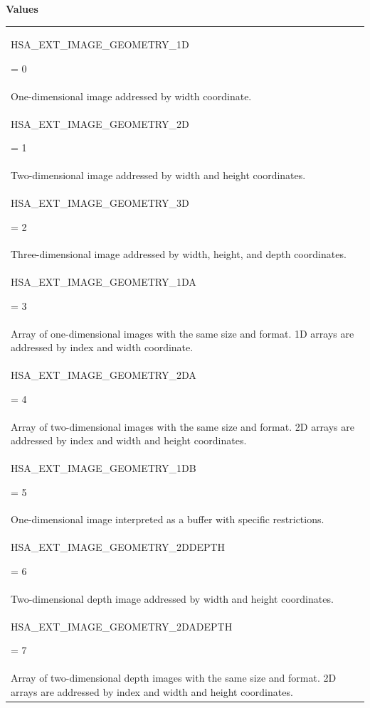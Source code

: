 \documentclass[final]{book}
\newcommand{\reftyp}[1]{#1}
\newcommand{\refenu}[1]{\reftyp{#1}}
\begin{document}
\noindent\textbf{Values}\\[-5mm]
\begin{longtable}{@{\hspace{2em}}p{\linewidth-2em}}
\hspace{-2em}\hypertarget{group__images_1ggac61587d98a80d1660378e3904a66fc9caa025ea993dbfe3101d3ff0caea2ea0cf}{\refenu{HSA_\-EXT_\-IMAGE_\-GEOMETRY_\-1D}} = 0\\One-dimensional image addressed by width coordinate.\\[2mm]
\hspace{-2em}\hypertarget{group__images_1ggac61587d98a80d1660378e3904a66fc9ca4bcc28ccad5a32bd9c9dbf203da4464e}{\refenu{HSA_\-EXT_\-IMAGE_\-GEOMETRY_\-2D}} = 1\\Two-dimensional image addressed by width and height coordinates.\\[2mm]
\hspace{-2em}\hypertarget{group__images_1ggac61587d98a80d1660378e3904a66fc9ca2e749b6b96377b9a744fc837296e318c}{\refenu{HSA_\-EXT_\-IMAGE_\-GEOMETRY_\-3D}} = 2\\Three-dimensional image addressed by width, height, and depth coordinates.\\[2mm]
\hspace{-2em}\hypertarget{group__images_1ggac61587d98a80d1660378e3904a66fc9cad989c8e619b376dc98ac3950be9afa33}{\refenu{HSA_\-EXT_\-IMAGE_\-GEOMETRY_\-1DA}} = 3\\Array of one-dimensional images with the same size and format. 1D arrays are addressed by index and width coordinate.\\[2mm]
\hspace{-2em}\hypertarget{group__images_1ggac61587d98a80d1660378e3904a66fc9ca90929e69cbf0b447060e1aeb23fd6dd4}{\refenu{HSA_\-EXT_\-IMAGE_\-GEOMETRY_\-2DA}} = 4\\Array of two-dimensional images with the same size and format. 2D arrays are addressed by index and width and height coordinates.\\[2mm]
\hspace{-2em}\hypertarget{group__images_1ggac61587d98a80d1660378e3904a66fc9ca47b208990ed715c37071f1fff17e812c}{\refenu{HSA_\-EXT_\-IMAGE_\-GEOMETRY_\-1DB}} = 5\\One-dimensional image interpreted as a buffer with specific restrictions.\\[2mm]
\hspace{-2em}\hypertarget{group__images_1ggac61587d98a80d1660378e3904a66fc9caf1f195107c114c7235275f047d2f0474}{\refenu{HSA_\-EXT_\-IMAGE_\-GEOMETRY_\-2DDEPTH}} = 6\\Two-dimensional depth image addressed by width and height coordinates.\\[2mm]
\hspace{-2em}\hypertarget{group__images_1ggac61587d98a80d1660378e3904a66fc9caf3d5440659a9dfd7892da13c1fe992bd}{\refenu{HSA_\-EXT_\-IMAGE_\-GEOMETRY_\-2DADEPTH}} = 7\\Array of two-dimensional depth images with the same size and format. 2D arrays are addressed by index and width and height coordinates.
\end{longtable}
\end{document}
